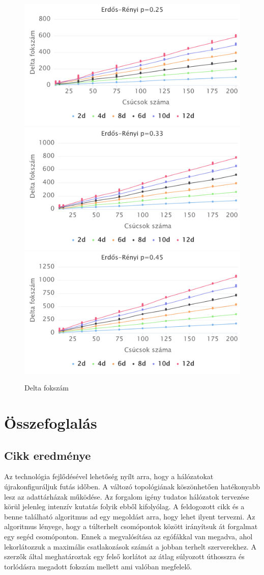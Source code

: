 \documentclass[12pt]{report}
\begin{document}
\begin{figure}[h]
	\begin{center}
		\includegraphics[width=0.40\linewidth]{pictures/constant_dan_ratio25_delta.png}
		\includegraphics[width=0.40\linewidth]{pictures/constant_dan_ratio33_delta.png}		
		\includegraphics[width=0.40\linewidth]{pictures/constant_dan_ratio45_delta.png}
		\caption{Delta fokszám}
		\label{delta}
	\end{center}
\end{figure}

\chapter{Összefoglalás}

\section{Cikk eredménye}

Az technológia fejlődésével lehetőség nyílt arra, hogy a hálózatokat újrakonfiguráljuk futás időben.
A változó topológiának köszönhetően hatékonyabb lesz az adattárházak működése.
Az forgalom igény tudatos hálózatok tervezése körül jelenleg intenzív kutatás folyik ebből kifolyólag. 
A feldogozott cikk és a benne található algoritmus ad egy megoldást arra, hogy lehet ilyent tervezni.
Az algoritmus lényege, hogy a túlterhelt csomópontok között irányítsuk át forgalmat egy segéd csomóponton.
Ennek a megvalósítása az egófákkal van megadva, ahol lekorlátozzuk a maximális csatlakozások számát a jobban terhelt szerverekhez.
A szerzők által meghatároztak egy felső korlátot az átlag súlyozott úthosszra és torlódásra megadott fokszám mellett ami valóban megfelelő.
\end{document}
